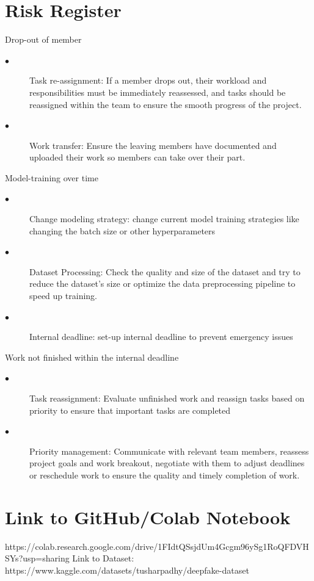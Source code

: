 \documentclass{article} %
\begin{document}
\section{Risk Register}
Drop-out of member
\begin{description}
  \item[$\bullet$]Task re-assignment: If a member drops out, their workload and responsibilities must be immediately reassessed, and tasks should be reassigned within the team to ensure the smooth progress of the project.
  \item[$\bullet$]Work transfer: Ensure the leaving members have documented and uploaded their work so members can take over their part.
\end{description}
Model-training over time
\begin{description}
  \item[$\bullet$]Change modeling strategy: change current model training strategies like changing the batch size or other hyperparameters
  \item[$\bullet$]Dataset Processing: Check the quality and size of the dataset and try to reduce the dataset's size or optimize the data preprocessing pipeline to speed up training.
  \item[$\bullet$]Internal deadline: set-up internal deadline to prevent emergency issues
\end{description}
Work not finished within the internal deadline
\begin{description}
  \item[$\bullet$]Task reassignment: Evaluate unfinished work and reassign tasks based on priority to ensure that important tasks are completed
  \item[$\bullet$]Priority management: Communicate with relevant team members, reassess project goals and work breakout, negotiate with them to adjust deadlines or reschedule work to ensure the quality and timely completion of work.
\end{description}

\section{Link to GitHub/Colab Notebook}
https://colab.research.google.com/drive/1FIdtQSsjdUm4Gcgm96ySg1RoQFDVHSYs?usp=sharing
Link to Dataset: https://www.kaggle.com/datasets/tusharpadhy/deepfake-dataset 

\label{last_page}



\end{document}
